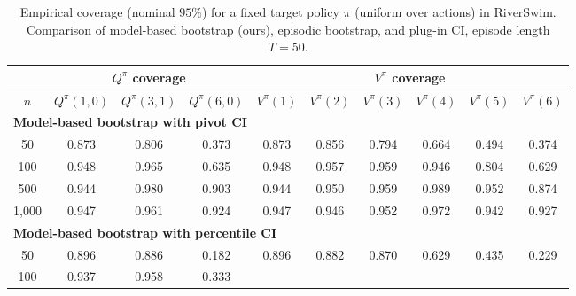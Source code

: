 \documentclass{article}
\numberwithin{equation}{section}
\begin{document}
\begin{table}[ht]
\centering
\caption{Empirical coverage (nominal $95\%$) for a fixed target policy $\pi$ (uniform over actions) in RiverSwim. Comparison of model-based bootstrap (ours), episodic bootstrap, and plug-in CI, episode length $T=50$.}
\label{tab:riverswim-uniform-coverage}
\begin{tabular}{c|ccc|cccccc}
\hline
& \multicolumn{3}{c|}{$Q^\pi$ coverage} & \multicolumn{6}{c}{$V^\pi$ coverage} \\ \hline
$n$
& $Q^\pi(1,0)$ & $Q^\pi(3,1)$ & $Q^\pi(6,0)$
& $V^\pi(1)$ & $V^\pi(2)$ & $V^\pi(3)$ & $V^\pi(4)$ & $V^\pi(5)$ & $V^\pi(6)$ \\
\hline
\multicolumn{10}{l}{\textbf{Model-based bootstrap with pivot CI}} \\ \hline
50
& \cellcolor{covheat!62!white}0.873 & \cellcolor{covheat!28!white}0.806 & 0.373
& \cellcolor{covheat!62!white}0.873 & \cellcolor{covheat!53!white}0.856 & \cellcolor{covheat!22!white}0.794 & 0.664 & 0.494 & 0.374 \\
100
& \cellcolor{covheat!99!white}0.948 & \cellcolor{covheat!100!white}0.965 & 0.635
& \cellcolor{covheat!99!white}0.948 & \cellcolor{covheat!100!white}0.957 & \cellcolor{covheat!100!white}0.959 & \cellcolor{covheat!98!white}0.946 & \cellcolor{covheat!27!white}0.804 & 0.629 \\
500
& \cellcolor{covheat!97!white}0.944 & \cellcolor{covheat!100!white}0.980 & \cellcolor{covheat!77!white}0.903
& \cellcolor{covheat!97!white}0.944 & \cellcolor{covheat!100!white}0.950 & \cellcolor{covheat!100!white}0.959 & \cellcolor{covheat!100!white}0.989 & \cellcolor{covheat!100!white}0.952 & \cellcolor{covheat!62!white}0.874 \\
1{,}000
& \cellcolor{covheat!98!white}0.947 & \cellcolor{covheat!100!white}0.961 & \cellcolor{covheat!87!white}0.924
& \cellcolor{covheat!98!white}0.947 & \cellcolor{covheat!98!white}0.946 & \cellcolor{covheat!100!white}0.952 & \cellcolor{covheat!100!white}0.972 & \cellcolor{covheat!96!white}0.942 & \cellcolor{covheat!89!white}0.927 \\
\hline
\multicolumn{10}{l}{\textbf{Model-based bootstrap with percentile CI}} \\ \hline
50
& \cellcolor{covheat!73!white}0.896 & \cellcolor{covheat!68!white}0.886 & 0.182
& \cellcolor{covheat!73!white}0.896 & \cellcolor{covheat!66!white}0.882 & \cellcolor{covheat!60!white}0.870 & 0.629 & 0.435 & 0.229 \\
100
& \cellcolor{covheat!94!white}0.937 & \cellcolor{covheat!100!white}0.958 & 0.333

\end{tabular}
\end{table}
\end{document}
